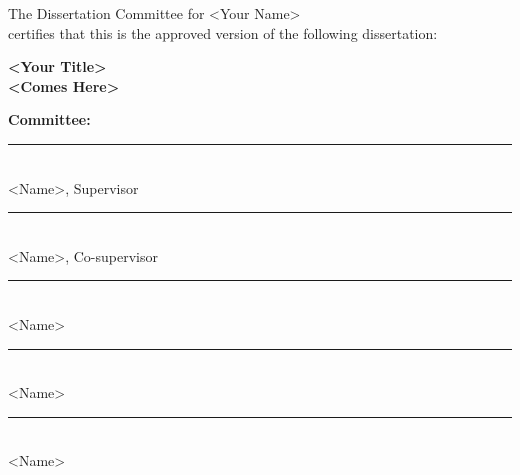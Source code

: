 \null
\begin{center}
The Dissertation Committee for <Your Name>\\
certifies that this is the approved version of the following dissertation:
\end{center}
\vspace{1em}

\begin{center}
    {\large\textbf{<Your Title>}}\\[0.2em]
    {\large\textbf{<Comes Here>}}
\end{center}

\vspace{2em}
\hfill\textbf{Committee:}\hspace{10em}
\vspace{2em}
\begin{flushright}
  \rule{16.3em}{0.4pt}\\[-1.1em]
  <Name>, Supervisor\\[2em]
  \rule{16.3em}{0.4pt}\\[-1.1em]
  <Name>, Co-supervisor\\[2em]
  \rule{16.3em}{0.4pt}\\[-1.1em]
  <Name>\\[2em]
  \rule{16.3em}{0.4pt}\\[-1.1em]
  <Name>\\[2em]
  \rule{16.3em}{0.4pt}\\[-1.1em]
  <Name>
\end{flushright}
\thispagestyle{empty}
\newpage